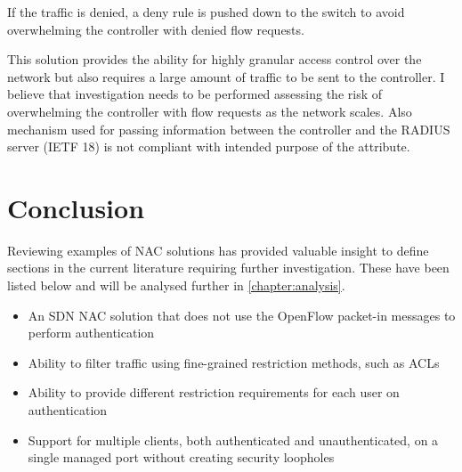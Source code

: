 If the traffic is denied, a deny rule is pushed down to the switch to avoid overwhelming the controller with denied flow requests.

This solution provides the ability for highly granular access control over the network but also requires a large amount of traffic to be sent to the controller. I believe that investigation needs to be performed assessing the risk of overwhelming the controller with flow requests as the network scales. Also mechanism used for passing information between the controller and the RADIUS server (IETF 18) is not compliant with intended purpose of the attribute.

\section{Conclusion}
Reviewing examples of NAC solutions has provided valuable insight to define sections in the current literature requiring further investigation. These have been listed below and will be analysed further in \ref{chapter:analysis}.
\begin{itemize}
    \item An SDN NAC solution that does not use the OpenFlow packet-in messages to perform authentication
    \item Ability to filter traffic using fine-grained restriction methods, such as ACLs
    \item Ability to provide different restriction requirements for each user on authentication
    \item Support for multiple clients, both authenticated and unauthenticated, on a single managed port without creating security loopholes
\end{itemize}